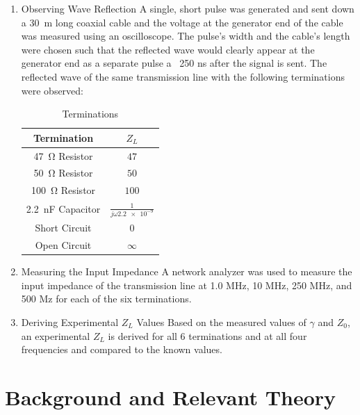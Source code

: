 \documentclass[conference]{IEEEtran}
\begin{document}
\begin{enumerate}
  \item{Observing Wave Reflection}
    A single, short pulse was generated and sent down a \SI{30}{\meter} long coaxial cable
    and the voltage at the generator end of the cable was measured using an
    oscilloscope. The pulse's width and the cable's length were chosen such that
    the reflected wave would clearly appear at the generator end as a separate
    pulse a ~250 ns after the signal is sent. The reflected wave of the same
    transmission line with the following terminations were observed:

    \begin{table}[H]
      \renewcommand{\arraystretch}{1.3}
      \caption{Terminations}
      \label{terminations}
      \centering
      \begin{tabular}{c||c}
        \hline
        \bfseries Termination & \bfseries $Z_L$\\
        \hline\hline
        \SI{47}{\ohm} Resistor           & $47$                             \\
        \SI{50}{\ohm} Resistor           & $50$                             \\
        \SI{100}{\ohm} Resistor          & $100$                            \\
        \SI{2.2}{\nano\farad} Capacitor  & $\frac{1}{j\omega\num{2.2e-9} } $\\
        Short Circuit                    & $0$                              \\
        Open Circuit                     & $\infty$                         \\
        \hline
      \end{tabular}
    \end{table}

  \item{Measuring the Input Impedance}
    A network analyzer was used to measure the input impedance of the
    transmission line at 1.0 MHz, 10 MHz, 250 MHz, and 500 Mz for each of the
    six terminations.

  \item{Deriving Experimental $Z_L$ Values}
    Based on the measured values of $\gamma$ and $Z_0$, an experimental $Z_L$ is
    derived for all 6 terminations and at all four frequencies and compared to
    the known values.
\end{enumerate}

\section{Background and Relevant Theory}
\end{document}
